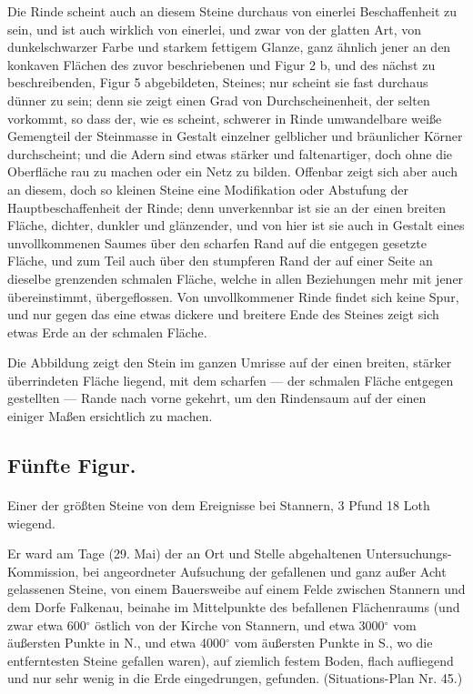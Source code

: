 \documentclass[a4paper, 11pt, oneside, german]{article}
\begin{document}
Die Rinde scheint auch an diesem Steine durchaus von einerlei Beschaffenheit zu sein, und ist auch wirklich von einerlei, und zwar von der glatten Art, von dunkelschwarzer Farbe und starkem fettigem Glanze, ganz ähnlich jener an den konkaven Flächen des zuvor beschriebenen und Figur 2 b, und des nächst zu beschreibenden, Figur 5 abgebildeten, Steines; nur scheint sie fast durchaus dünner zu sein; denn sie zeigt einen Grad von Durchscheinenheit, der selten vorkommt, so dass der, wie es scheint, schwerer in Rinde umwandelbare weiße Gemengteil der Steinmasse in Gestalt einzelner gelblicher und bräunlicher Körner durchscheint; und die Adern sind etwas stärker und faltenartiger, doch ohne die Oberfläche rau zu machen oder ein Netz zu bilden. Offenbar zeigt sich aber auch an diesem, doch so kleinen Steine eine Modifikation oder Abstufung der Hauptbeschaffenheit der Rinde; denn unverkennbar ist sie an der einen breiten Fläche, dichter, dunkler und glänzender, und von hier ist sie auch in Gestalt eines unvollkommenen Saumes über den scharfen Rand auf die entgegen gesetzte Fläche, und zum Teil auch über den stumpferen Rand der auf einer Seite an dieselbe grenzenden schmalen Fläche, welche in allen Beziehungen mehr mit jener übereinstimmt, übergeflossen. Von unvollkommener Rinde findet sich keine Spur, und nur gegen das eine etwas dickere und breitere Ende des Steines zeigt sich etwas Erde an der schmalen Fläche.

Die Abbildung zeigt den Stein im ganzen Umrisse auf der einen breiten, stärker überrindeten Fläche liegend, mit dem scharfen --- der schmalen Fläche entgegen gestellten --- Rande nach vorne gekehrt, um den Rindensaum auf der einen einiger Maßen ersichtlich zu machen.

\subsection{Fünfte Figur.}
\paragraph{}
Einer der größten Steine von dem Ereignisse bei Stannern, 3 Pfund 18 Loth wiegend.

Er ward am Tage (29. Mai) der an Ort und Stelle abgehaltenen Untersuchungs-Kommission, bei angeordneter Aufsuchung der gefallenen und ganz außer Acht gelassenen Steine, von einem Bauersweibe auf einem Felde zwischen Stannern und dem Dorfe Falkenau, beinahe im Mittelpunkte des befallenen Flächenraums (und zwar etwa 600$^{\circ}$ östlich von der Kirche von Stannern, und etwa 3000$^{\circ}$ vom äußersten Punkte in N., und etwa 4000$^{\circ}$ vom äußersten Punkte in S., wo die entferntesten Steine gefallen waren), auf ziemlich festem Boden, flach aufliegend und nur sehr wenig in die Erde eingedrungen, gefunden. (Situations-Plan Nr. 45.)
\end{document}
